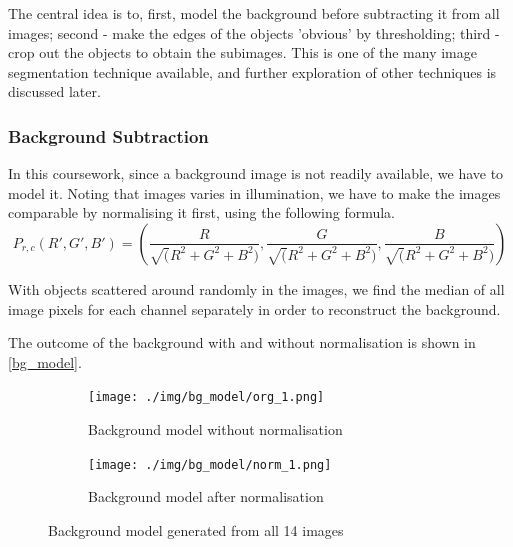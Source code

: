 \documentclass[main.tex]{subfiles}
\begin{document}
The central idea is to, first, model the background before subtracting it from all images; second - make the edges of the objects 'obvious' by thresholding; third - crop out the objects to obtain the subimages. This is one of the many image segmentation technique available, and further exploration of other techniques is discussed later.

\subsubsection*{Background Subtraction}
In this coursework, since a background image is not readily available, we have to model it. Noting that images varies in illumination, we have to make the images comparable by normalising it first, using the following formula.
$$ P_{r,c}(R',G',B')=(\frac{R}{\sqrt(R^2+G^2+B^2)},\frac{G}{\sqrt(R^2+G^2+B^2)},\frac{B}{\sqrt(R^2+G^2+B^2)})$$

With objects scattered around randomly in the images, we find the median of all image pixels for each channel separately in order to reconstruct the background.

The outcome of the background with and without normalisation is shown in \autoref{bg_model}.

\begin{figure}[!h]
  \centering
  \begin{subfigure}[b]{.45\textwidth}
    \centering
    \texttt{[image: ./img/bg\_model/org\_1.png]}
    \caption{Background model without normalisation}
  \end{subfigure}
  \begin{subfigure}[b]{.45\textwidth}
    \centering
    \texttt{[image: ./img/bg\_model/norm\_1.png]}
    \caption{Background model after normalisation}
  \end{subfigure}
  \caption{Background model generated from all 14 images}
  \label{bg_model}
\end{figure}
\end{document}

